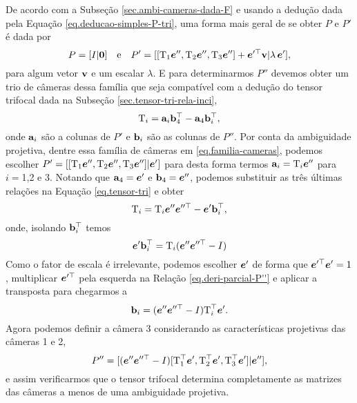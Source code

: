 De acordo com a Subseção \ref{sec.ambi-cameras-dada-F} e usando a dedução dada pela Equação \ref{eq.deducao-simples-P-tri}, uma forma mais geral de se obter $P$ e $P'$ é dada por
\begin{equation}\label{eq.familia-cameras}
P=[I|{\bf 0}]\quad\text{e}\quad P'=[[\mbox{T}_1\boldsymbol{e}'',\mbox{T}_2\boldsymbol{e}'',\mbox{T}_3\boldsymbol{e}'']+\boldsymbol{e}'^\top{\bf v} |\lambda\,\boldsymbol{e}'],
\end{equation}    
para algum vetor ${\bf v}$ e um escalar $\lambda$. E para determinarmos $P''$ devemos obter um trio de câmeras dessa família que seja compatível com a dedução do tensor trifocal dada na Subseção \ref{sec.tensor-tri-rela-inci},
\begin{equation}\label{eq.tensor-tri}
\mbox{T}_i={\bf a}_i{\bf b}_4^\top-{\bf a}_4{\bf b}_i^\top,
\end{equation}
onde ${\bf a}_i$ são a colunas de $P'$ e ${\bf b}_i$ são as colunas de $P''$.
Por conta da ambiguidade projetiva, dentre essa família de câmeras em \ref{eq.familia-cameras}, podemos escolher $P'=[[\mbox{T}_1\boldsymbol{e}'',\mbox{T}_2\boldsymbol{e}'',\mbox{T}_3\boldsymbol{e}'']|\boldsymbol{e}']$ para desta forma termos ${\bf a}_i=\mbox{T}_i\boldsymbol{e}''$ para $i=$1,2 e 3. Notando que ${\bf a}_4=\boldsymbol{e}'$ e ${\bf b}_4=\boldsymbol{e}''$, podemos substituir as três últimas relações na Equação \ref{eq.tensor-tri} e obter
\begin{equation*}
\mbox{T}_i=\mbox{T}_i\boldsymbol{e}''\boldsymbol{e}''^\top-\boldsymbol{e}'{\bf b}_i^\top,
\end{equation*}
onde, isolando ${\bf b}_i^\top$ temos 
\begin{equation}\label{eq.deri-parcial-P''}
\boldsymbol{e}'{\bf b}_i^\top=\mbox{T}_i (\boldsymbol{e}''\boldsymbol{e}''^\top-I)
\end{equation}
Como o fator de escala é irrelevante, podemos escolher $\boldsymbol{e}'$ de forma que $\boldsymbol{e}'^\top\boldsymbol{e}'=1$, multiplicar $\boldsymbol{e}'^\top$ pela esquerda na Relação \ref{eq.deri-parcial-P''} e aplicar a transposta para chegarmos a
\begin{equation*}
{\bf b}_i=(\boldsymbol{e}''\boldsymbol{e}''^\top -I)\mbox{T}_i^\top\boldsymbol{e}'.
\end{equation*}
Agora podemos definir a câmera 3 considerando as características projetivas das câmeras 1 e 2,
\begin{equation*}
P''=[(\boldsymbol{e}''\boldsymbol{e}''^\top -I)[\mbox{T}_1^\top\boldsymbol{e}',\mbox{T}_2^\top\boldsymbol{e}',\mbox{T}_3^\top\boldsymbol{e}']|\boldsymbol{e}''],
\end{equation*}
e assim verificarmos que o tensor trifocal determina completamente as matrizes das câmeras a menos de uma ambiguidade projetiva.

